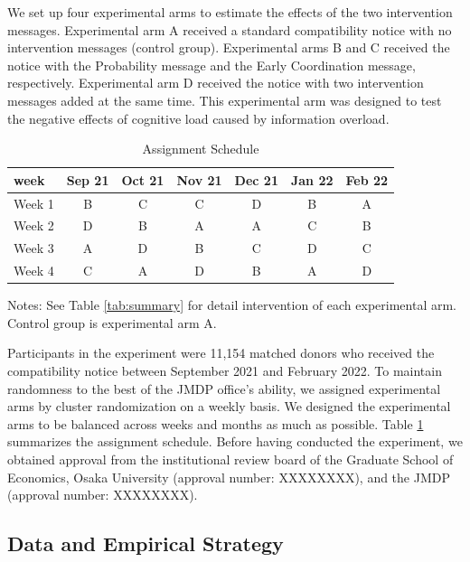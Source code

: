 \documentclass[
]{article}
\begin{document}
We set up four experimental arms to estimate the effects of the two intervention messages. Experimental arm A received a standard compatibility notice with no intervention messages (control group). Experimental arms B and C received the notice with the Probability message and the Early Coordination message, respectively. Experimental arm D received the notice with two intervention messages added at the same time. This experimental arm was designed to test the negative effects of cognitive load caused by information overload.

\begin{table}

\caption{\label{tab:assignment}Assignment Schedule}
\centering
\fontsize{9}{11}\selectfont
\fontsize{9}{11}\selectfont
\begin{threeparttable}
\begin{tabular}[t]{lcccccc}
\toprule
week & Sep 21 & Oct 21 & Nov 21 & Dec 21 & Jan 22 & Feb 22\\
\midrule
Week 1 & B & C & C & D & B & A\\
Week 2 & D & B & A & A & C & B\\
Week 3 & A & D & B & C & D & C\\
Week 4 & C & A & D & B & A & D\\
\bottomrule
\end{tabular}
\begin{tablenotes}
\item Notes: See Table \ref{tab:summary} for detail intervention of each experimental arm. Control group is experimental arm A.
\end{tablenotes}
\end{threeparttable}
\end{table}

Participants in the experiment were 11,154 matched donors who received the compatibility notice between September 2021 and February 2022. To maintain randomness to the best of the JMDP office's ability, we assigned experimental arms by cluster randomization on a weekly basis. We designed the experimental arms to be balanced across weeks and months as much as possible. Table \ref{tab:assignment} summarizes the assignment schedule. Before having conducted the experiment, we obtained approval from the institutional review board of the Graduate School of Economics, Osaka University (approval number: XXXXXXXX), and the JMDP (approval number: XXXXXXXX).

\hypertarget{data-and-empirical-strategy}{%
\subsection{Data and Empirical Strategy}\label{data-and-empirical-strategy}}
\end{document}

